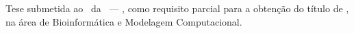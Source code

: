 \begingroup
\thispagestyle{empty}
\begin{center}
  \vspace*{2cm}

  {\scshape\Large \myName}\par
  \vspace{3cm}

  {\spacedallcaps{\myTitle}}\par
  \vspace{0.6cm}
  {\large\textit{\mySubtitle}}\par

  \vspace*{\fill}

  \begin{flushright}
    \begin{minipage}{0.55\textwidth}
      \small
      Tese submetida ao
      \myFaculty\ da \myUni\ --- \myDepartment, como requisito parcial
      para a obtenção do título de \textbf{\myDegree}, na área de
      Bioinformática e Modelagem Computacional.
    \end{minipage}
  \end{flushright}

  \vspace*{\fill}

  {\normalsize\myLocation\\ \myTime}\par
  \vspace{2cm}
\end{center}
\endgroup
